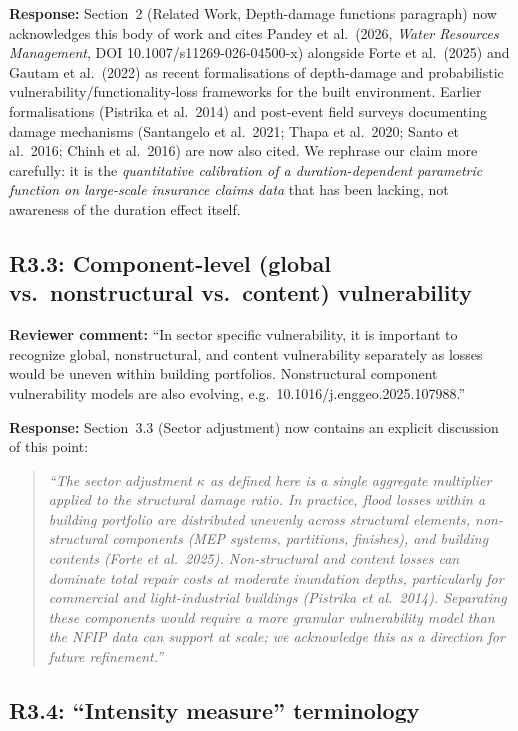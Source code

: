 \documentclass[11pt]{article}
\begin{document}
\textbf{Response:} Section~2 (Related Work, Depth-damage functions paragraph) now acknowledges this body of work and cites Pandey et al.\ (2026, \textit{Water Resources Management}, DOI 10.1007/s11269-026-04500-x) alongside Forte et al.\ (2025) and Gautam et al.\ (2022) as recent formalisations of depth-damage and probabilistic vulnerability/functionality-loss frameworks for the built environment. Earlier formalisations (Pistrika et al.\ 2014) and post-event field surveys documenting damage mechanisms (Santangelo et al.\ 2021; Thapa et al.\ 2020; Santo et al.\ 2016; Chinh et al.\ 2016) are now also cited. We rephrase our claim more carefully: it is the \textit{quantitative calibration of a duration-dependent parametric function on large-scale insurance claims data} that has been lacking, not awareness of the duration effect itself.

\subsection*{R3.3: Component-level (global vs.\ nonstructural vs.\ content) vulnerability}

\textbf{Reviewer comment:} ``In sector specific vulnerability, it is important to recognize global, nonstructural, and content vulnerability separately as losses would be uneven within building portfolios. Nonstructural component vulnerability models are also evolving, e.g.\ 10.1016/j.enggeo.2025.107988.''

\textbf{Response:} Section~3.3 (Sector adjustment) now contains an explicit discussion of this point:
\begin{quote}
\textit{``The sector adjustment $\kappa$ as defined here is a single aggregate multiplier applied to the structural damage ratio. In practice, flood losses within a building portfolio are distributed unevenly across structural elements, non-structural components (MEP systems, partitions, finishes), and building contents (Forte et al.\ 2025). Non-structural and content losses can dominate total repair costs at moderate inundation depths, particularly for commercial and light-industrial buildings (Pistrika et al.\ 2014). Separating these components would require a more granular vulnerability model than the NFIP data can support at scale; we acknowledge this as a direction for future refinement.''}
\end{quote}

\subsection*{R3.4: ``Intensity measure'' terminology}
\end{document}
